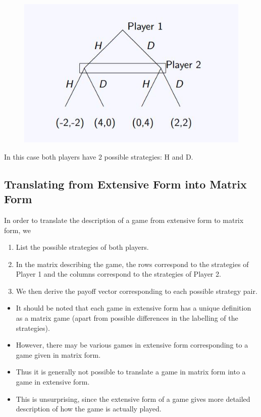 \documentclass[]{report}
\begin{document}


\begin{figure}[h!]
\centering
\includegraphics[width=0.55\linewidth]{images/DR5-Slide15}
\caption{}
\label{fig:DR5-Slide15}
\end{figure}
In this case both players have 2 possible strategies: H and D.

\subsection{Translating from Extensive Form into Matrix Form}
In order to translate the description of a game from extensive form
to matrix form, we
\begin{enumerate}
\item  List the possible strategies of both players.
\item In the matrix describing the game, the rows
correspond to the strategies of Player 1 and the
columns correspond to the strategies of Player 2.
\item We then derive the payoff vector corresponding to
each possible strategy pair.
\end{enumerate}
\begin{itemize}
	\item It should be noted that each game in extensive form has a unique
	definition as a matrix game (apart from possible differences in the
	labelling of the strategies).
\item However, there may be various games in extensive form
	corresponding to a game given in matrix form. 
\item Thus it is generally
	not possible to translate a game in matrix form into a game in
	extensive form.
\item This is unsurprising, since the extensive form of a game gives more
	detailed description of how the game is actually played.
\end{itemize}
\end{document}
